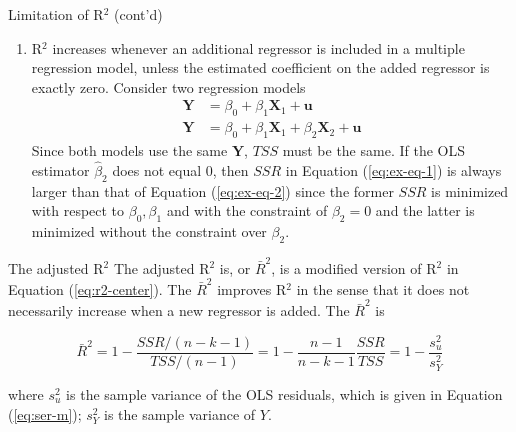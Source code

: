 \documentclass[presentation,10pt]{beamer}
\begin{document}
\begin{frame}[label={sec:org0ee6979}]{Limitation of R\(^{\text{2}}\) (cont'd)}
\begin{enumerate}
\item R\(^{\text{2}}\) increases whenever an additional regressor is included in a
multiple regression model, unless the estimated coefficient on the
added regressor is exactly zero. Consider two regression models
\begin{align}
\mathbf{Y} &= \beta_0 + \beta_1 \mathbf{X}_1 + \mathbf{u}
\label{eq:ex-eq-1} \\
\mathbf{Y} &= \beta_0 + \beta_1 \mathbf{X}_1 + \beta_2 \mathbf{X}_2 + \mathbf{u} \label{eq:ex-eq-2}
\end{align}
Since both models use the same \(\mathbf{Y}\), \(TSS\) must be the
same. If the OLS estimator \(\hat{\beta}_2\) does not equal 0, then
\(SSR\) in Equation (\ref{eq:ex-eq-1}) is always larger than that of
Equation (\ref{eq:ex-eq-2})  since the former \(SSR\) is minimized
with respect to \(\beta_0, \beta_1\) and with the constraint of
\(\beta_2 = 0\) and the latter is minimized without the constraint
over \(\beta_2\).
\end{enumerate}
\end{frame}

\begin{frame}[label={sec:org481c840}]{The adjusted R\(^{\text{2}}\)}
The adjusted R\(^{\text{2}}\) is, or \(\bar{R}^2\), is a modified version of R\(^{\text{2}}\) in
Equation (\ref{eq:r2-center}). The \(\bar{R}^2\) improves R\(^{\text{2}}\) in the
sense that it does not necessarily increase when a new regressor is
added. The \(\bar{R}^2\) is

\begin{equation}
\label{eq:adj-r2}
\bar{R}^2 = 1 - \frac{SSR / (n-k-1)}{TSS / (n-1)} = 1 - \frac{n-1}{n-k-1}\frac{SSR}{TSS} = 1 - \frac{s^2_u}{s^2_Y}
\end{equation}

where \(s^2_u\) is the sample variance of the OLS residuals, which is given
in Equation (\ref{eq:ser-m}); \(s^2_Y\) is the sample variance of \(Y\).
\end{frame}
\end{document}
